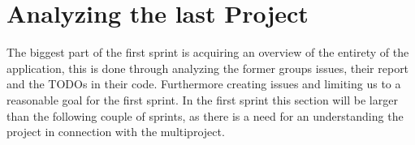 \section{Analyzing the last Project}

The biggest part of the first sprint is acquiring an overview of the entirety of the application, this is done through analyzing the former groups issues, their report and the TODOs in their code. Furthermore creating issues and limiting us to a reasonable goal for the first sprint.
In the first sprint this section will be larger than the following couple of sprints, as there is a need for an understanding the project in connection with the multiproject. 


